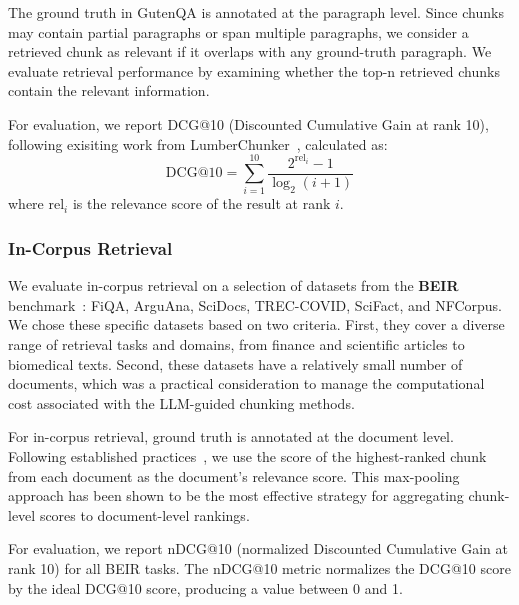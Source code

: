 The ground truth in GutenQA is annotated at the paragraph level. Since chunks may contain partial paragraphs or span multiple paragraphs, we consider a retrieved chunk as relevant if it overlaps with any ground-truth paragraph. We evaluate retrieval performance by examining whether the top-n retrieved chunks contain the relevant information.

For evaluation, we report DCG@10 (Discounted Cumulative Gain at rank 10), following exisiting work from LumberChunker~\cite{lumber}, calculated as:
$$ \mathrm{DCG@10} = \sum_{i=1}^{10} \frac{2^{\mathrm{rel}_i} - 1}{\log_2(i+1)} $$
where $\mathrm{rel}_i$ is the relevance score of the result at rank $i$.

\subsubsection{In-Corpus Retrieval}
We evaluate in-corpus retrieval on a selection of datasets from the \textbf{BEIR} benchmark~\cite{thakur_beir_2021}: FiQA, ArguAna, SciDocs, TREC-COVID, SciFact, and NFCorpus. We chose these specific datasets based on two criteria. First, they cover a diverse range of retrieval tasks and domains, from finance and scientific articles to biomedical texts. Second, these datasets have a relatively small number of documents, which was a practical consideration to manage the computational cost associated with the LLM-guided chunking methods.

For in-corpus retrieval, ground truth is annotated at the document level. Following established practices~\cite{dai2019deeper}, we use the score of the highest-ranked chunk from each document as the document's relevance score. This max-pooling approach has been shown to be the most effective strategy for aggregating chunk-level scores to document-level rankings.

For evaluation, we report nDCG@10 (normalized Discounted Cumulative Gain at rank 10) for all BEIR tasks. The nDCG@10 metric normalizes the DCG@10 score by the ideal DCG@10 score, producing a value between 0 and 1.

